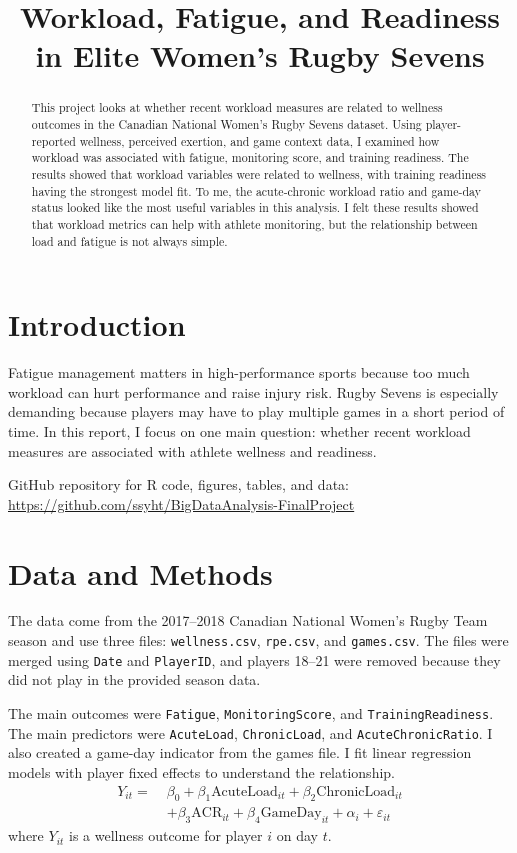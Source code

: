 \documentclass[conference]{IEEEtran}
\title{Workload, Fatigue, and Readiness in Elite Women’s Rugby Sevens}
\author{
\IEEEauthorblockN{Sanjit Subhash}}
\begin{document}
\maketitle

\begin{abstract}
This project looks at whether recent workload measures are related to wellness outcomes in the Canadian National Women's Rugby Sevens dataset. Using player-reported wellness, perceived exertion, and game context data, I examined how workload was associated with fatigue, monitoring score, and training readiness. The results showed that workload variables were related to wellness, with training readiness having the strongest model fit. To me, the acute-chronic workload ratio and game-day status looked like the most useful variables in this analysis. I felt these results showed that workload metrics can help with athlete monitoring, but the relationship between load and fatigue is not always simple.
\end{abstract}

\section{Introduction}
Fatigue management matters in high-performance sports because too much workload can hurt performance and raise injury risk. Rugby Sevens is especially demanding because players may have to play multiple games in a short period of time. In this report, I focus on one main question: whether recent workload measures are associated with athlete wellness and readiness.

\noindent
GitHub repository for R code, figures, tables, and data: \url{https://github.com/ssyht/BigDataAnalysis-FinalProject}

\section{Data and Methods}
The data come from the 2017--2018 Canadian National Women's Rugby Team season and use three files: \texttt{wellness.csv}, \texttt{rpe.csv}, and \texttt{games.csv}. The files were merged using \texttt{Date} and \texttt{PlayerID}, and players 18--21 were removed because they did not play in the provided season data.

The main outcomes were \texttt{Fatigue}, \texttt{MonitoringScore}, and \texttt{TrainingReadiness}. The main predictors were \texttt{AcuteLoad}, \texttt{ChronicLoad}, and \texttt{AcuteChronicRatio}. I also created a game-day indicator from the games file. I fit linear regression models with player fixed effects to understand the relationship.
\begin{equation}
\begin{aligned}
Y_{it} =\;& \beta_0 + \beta_1 \text{AcuteLoad}_{it} + \beta_2 \text{ChronicLoad}_{it} \\
&+ \beta_3 \text{ACR}_{it} + \beta_4 \text{GameDay}_{it} + \alpha_i + \varepsilon_{it}
\end{aligned}
\end{equation}
where $Y_{it}$ is a wellness outcome for player $i$ on day $t$.
\end{document}
